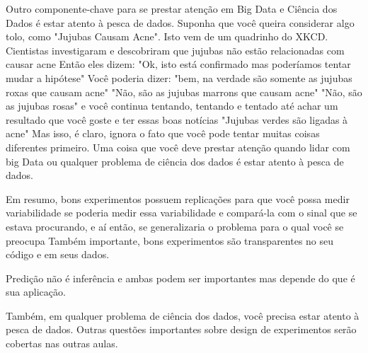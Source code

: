 \begin{multicols}{2}
\begin{footnotesize}
Outro componente-chave para se prestar atenção em Big Data e Ciência dos Dados é estar atento à pesca de dados. Suponha que você queira considerar algo tolo, como "Jujubas Causam Acne". Isto vem de um quadrinho do XKCD. Cientistas investigaram e descobriram que jujubas não estão relacionadas com causar acne Então eles dizem: "Ok, isto está confirmado mas poderíamos tentar mudar a hipótese" Você poderia dizer: "bem, na verdade são somente as jujubas roxas que causam acne" "Não, são as jujubas marrons que causam acne" "Não, são as jujubas rosas" e você continua tentando, tentando e tentado até achar um resultado que você goste e ter essas boas notícias "Jujubas verdes são ligadas à acne" Mas isso, é claro, ignora o fato que você pode tentar muitas coisas diferentes primeiro. Uma coisa que você deve prestar atenção quando lidar com big Data ou qualquer problema de ciência dos dados é estar atento à pesca de dados. 

Em resumo, bons experimentos possuem replicações para que você possa medir variabilidade se poderia medir essa variabilidade e compará-la com o sinal que se estava procurando, e aí então, se generalizaria o problema para o qual você se preocupa Também importante, bons experimentos são transparentes no seu código e em seus dados. 

Predição não é inferência e ambas podem ser importantes mas depende do que é sua aplicação. 

Também, em qualquer problema de ciência dos dados, você precisa estar atento à pesca de dados. Outras questões importantes sobre design de experimentos serão cobertas nas outras aulas. 
\end{footnotesize}
\end{multicols}

